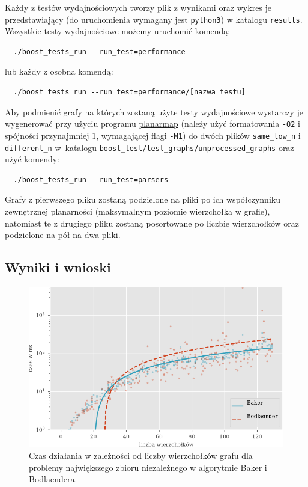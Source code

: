 \documentclass[twoside,a4paper,12pt]{report} %
\theoremstyle{break}
\begin{document}
Każdy z testów wydajnościowych tworzy plik z wynikami oraz wykres je przedstawiający (do uruchomienia wymagany jest \texttt{python3}) w katalogu \texttt{results}. Wszystkie testy wydajnościowe możemy uruchomić komendą:
\begin{verbatim}
  ./boost_tests_run --run_test=performance
\end{verbatim}
lub każdy z osobna komendą:
\begin{verbatim}
  ./boost_tests_run --run_test=performance/[nazwa testu]
\end{verbatim}

Aby podmienić grafy na których zostaną użyte testy wydajnościowe wystarczy je wygenerować przy użyciu programu \href{http://www.lix.polytechnique.fr/~schaeffe/PagesWeb/PlanarMap/index-en.html}{planarmap} (należy użyć formatowania \texttt{-O2} i spójności przynajmniej $1$, wymagającej flagi \texttt{-M1}) do dwóch plików  \texttt{same\_low\_n} i \texttt{different\_n} w~katalogu \texttt{boost\_test/test\_graphs/unprocessed\_graphs} oraz użyć komendy:
\begin{verbatim}
  ./boost_tests_run --run_test=parsers
\end{verbatim}

Grafy z pierwszego pliku zostaną podzielone na pliki po ich współczynniku zewnętrznej planarności (maksymalnym poziomie wierzchołka w grafie), natomiast te z drugiego pliku zostaną posortowane po liczbie wierzchołków oraz podzielone na pół na dwa pliki.



\subsection{Wyniki i wnioski}

\begin{figure}[h!]
    \centering
    \includegraphics[scale=1.0]{wykresy/is_n.pdf}
    \caption{Czas działania w zależności od liczby wierzchołków grafu dla problemy największego zbioru niezależnego w algorytmie Baker i Bodlaendera.}
    \label{is_n}
\end{figure}
\end{document}
